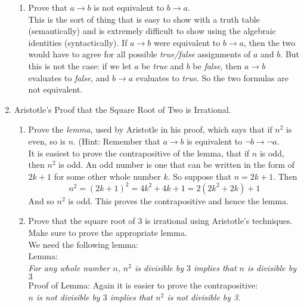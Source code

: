 \documentclass[12pt]{amsart}
\begin{document}
\begin{enumerate}
\begin{enumerate}
    \item   Prove that $a \rightarrow b$ is not
            equivalent to $ b \rightarrow a$.\\
    This is the sort of thing that is easy to show with a truth table (semantically)
    and is extremely difficult to show using the algebraic identities (syntactically).
    If $a \rightarrow b$ were equivalent to $b \rightarrow a$, then the two would have
    to agree for all possible {\em true/false} assignments of $a$ and $b$. But this is not
    the case: if we let $a$ be {\em true} and $b$ be {\em false}, then $a
\rightarrow b$
    evaluates to {\em false}, and $b \rightarrow a$ evaluates to {\em true}. So the two
    formulas are not equivalent.
    \end{enumerate}
    \vskip 5pt
\item {Aristotle's Proof that the Square Root of Two is Irrational.}\\
    \begin{enumerate}
    \item Prove the  {\em lemma,} used by Aristotle in his proof,
        which says that if $n^{2}$ is even, so is
        $n$. (Hint: Remember that $a \rightarrow  b$
        is equivalent to $\neg b \rightarrow \neg a$.\\
    It is easiest to prove the contrapositive of the lemma, that if
    $n$ is odd, then $n^2$ is odd. An odd number is one that can be
    written in the form of $2k+1$ for some other whole number $k$.
    So suppose that $n = 2k+1$. Then
    \[
    n^2 = (2k+1)^2 = 4k^2 + 4k + 1 = 2(2k^2 + 2k) + 1
    \]
    And so $n^2$ is odd. This proves the contrapositive and hence the lemma.
    \item
        Prove that the square root of 3 is irrational using Aristotle's
        techniques. Make sure to prove the appropriate lemma.\\
    We need the following lemma: \\

    Lemma: \\
    {\em For any whole number $n$, $n^2$ is divisible by $3$ implies that
    $n$ is divisible by $3$ } \\

    Proof of Lemma: Again it is easier to prove the contrapositive:\\

    {\em $n$ is not divisible by $3$ implies that $n^2$ is not divisible by 3.} \\


\end{enumerate}
\end{enumerate}
\end{document}
